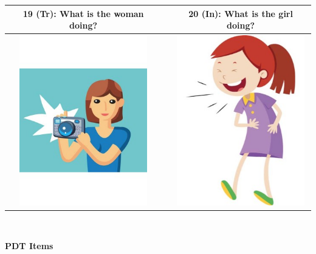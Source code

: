 \begin{tabular}{|c|c|c|}
\hline
19 (Tr): What is the woman doing? && 20 (In): What is the girl doing? \\
\hline
\includegraphics[width=15em,trim=0 0 0 -3]{figures/I19.jpg} & & \includegraphics[width=15em,trim=0 0 0 -3]{figures/I20.jpg} \\
\hline
\end{tabular}
\vspace{1em} \\


\clearpage

{\large \textbf{PDT Items}}

\vspace{2em}

